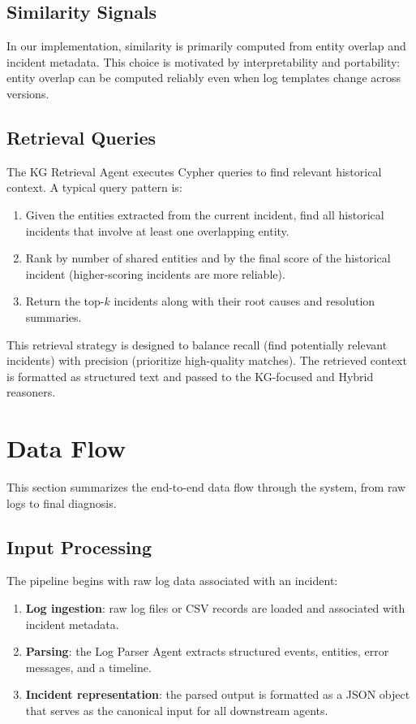 \subsection{Similarity Signals}
In our implementation, similarity is primarily computed from entity overlap and incident metadata.
This choice is motivated by interpretability and portability: entity overlap can be computed
reliably even when log templates change across versions.

\subsection{Retrieval Queries}
The KG Retrieval Agent executes Cypher queries to find relevant historical context. A typical
query pattern is:
\begin{enumerate}
  \item Given the entities extracted from the current incident, find all historical incidents that
        involve at least one overlapping entity.
  \item Rank by number of shared entities and by the final score of the historical incident
        (higher-scoring incidents are more reliable).
  \item Return the top-$k$ incidents along with their root causes and resolution summaries.
\end{enumerate}

This retrieval strategy is designed to balance recall (find potentially relevant incidents) with
precision (prioritize high-quality matches). The retrieved context is formatted as structured text
and passed to the KG-focused and Hybrid reasoners.

\section{Data Flow}
This section summarizes the end-to-end data flow through the system, from raw logs to final
diagnosis.

\subsection{Input Processing}
The pipeline begins with raw log data associated with an incident:
\begin{enumerate}
  \item \textbf{Log ingestion}: raw log files or CSV records are loaded and associated with
        incident metadata.
  \item \textbf{Parsing}: the Log Parser Agent extracts structured events, entities, error
        messages, and a timeline.
  \item \textbf{Incident representation}: the parsed output is formatted as a JSON object that
        serves as the canonical input for all downstream agents.
\end{enumerate}

